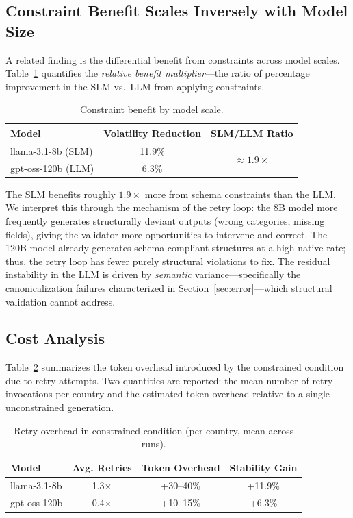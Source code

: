 \documentclass[sigconf]{acmart}
\begin{document}
\subsection{Constraint Benefit Scales Inversely with Model Size}

A related finding is the differential benefit from constraints across model scales. Table~\ref{tab:benefit} quantifies the \emph{relative benefit multiplier}---the ratio of percentage improvement in the SLM vs.\ LLM from applying constraints.

\begin{table}[h]
\caption{Constraint benefit by model scale.}
\label{tab:benefit}
\small
\begin{tabular}{lcc}
\toprule
\textbf{Model} & \textbf{Volatility Reduction} & \textbf{SLM/LLM Ratio} \\
\midrule
llama-3.1-\allowbreak 8b (SLM) & 11.9\% & \multirow{2}{*}{$\approx1.9\times$} \\
gpt-oss-\allowbreak 120b (LLM) & 6.3\%  & \\
\bottomrule
\end{tabular}
\end{table}

The SLM benefits roughly $1.9\times$ more from schema constraints than the LLM. We interpret this through the mechanism of the retry loop: the 8B model more frequently generates structurally deviant outputs (wrong categories, missing fields), giving the validator more opportunities to intervene and correct. The 120B model already generates schema-compliant structures at a high native rate; thus, the retry loop has fewer purely structural violations to fix. The residual instability in the LLM is driven by \emph{semantic} variance---specifically the canonicalization failures characterized in Section~\ref{sec:error}---which structural validation cannot address.

\subsection{Cost Analysis}
\label{sec:cost}

Table~\ref{tab:cost} summarizes the token overhead introduced by the constrained condition due to retry attempts. Two quantities are reported: the mean number of retry invocations per country and the estimated token overhead relative to a single unconstrained generation.

\begin{table}[h]
\caption{Retry overhead in constrained condition (per country, mean across runs).}
\label{tab:cost}
\small
\begin{tabular}{lccc}
\toprule
\textbf{Model} & \textbf{Avg. Retries} & \textbf{Token Overhead} & \textbf{Stability Gain} \\
\midrule
llama-3.1-\allowbreak 8b   & 1.3$\times$ & +30--40\%   & +11.9\% \\
gpt-oss-\allowbreak 120b   & 0.4$\times$ & +10--15\%   & +6.3\%  \\
\bottomrule
\end{tabular}
\end{table}
\end{document}
